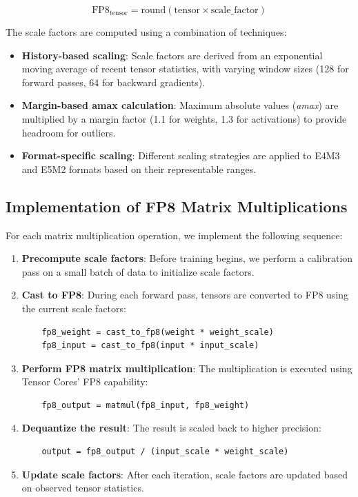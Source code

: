 \begin{equation}
    \text{FP8}_{\text{tensor}} = \text{round}(\text{tensor} \times \text{scale\_factor})
\end{equation}

The scale factors are computed using a combination of techniques:

\begin{itemize}
    \item \textbf{History-based scaling}: Scale factors are derived from an exponential moving average of recent tensor statistics, with varying window sizes (128 for forward passes, 64 for backward gradients).
    \item \textbf{Margin-based amax calculation}: Maximum absolute values (\textit{amax}) are multiplied by a margin factor (1.1 for weights, 1.3 for activations) to provide headroom for outliers.
    \item \textbf{Format-specific scaling}: Different scaling strategies are applied to E4M3 and E5M2 formats based on their representable ranges.
\end{itemize}

\subsection{Implementation of FP8 Matrix Multiplications}

For each matrix multiplication operation, we implement the following sequence:

\begin{enumerate}
    \item \textbf{Precompute scale factors}: Before training begins, we perform a calibration pass on a small batch of data to initialize scale factors.
    \item \textbf{Cast to FP8}: During each forward pass, tensors are converted to FP8 using the current scale factors:
    \begin{verbatim}
    fp8_weight = cast_to_fp8(weight * weight_scale)
    fp8_input = cast_to_fp8(input * input_scale)
    \end{verbatim}
    
    \item \textbf{Perform FP8 matrix multiplication}: The multiplication is executed using Tensor Cores' FP8 capability:
    \begin{verbatim}
    fp8_output = matmul(fp8_input, fp8_weight)
    \end{verbatim}
    
    \item \textbf{Dequantize the result}: The result is scaled back to higher precision:
    \begin{verbatim}
    output = fp8_output / (input_scale * weight_scale)
    \end{verbatim}
    
    \item \textbf{Update scale factors}: After each iteration, scale factors are updated based on observed tensor statistics.
\end{enumerate}

